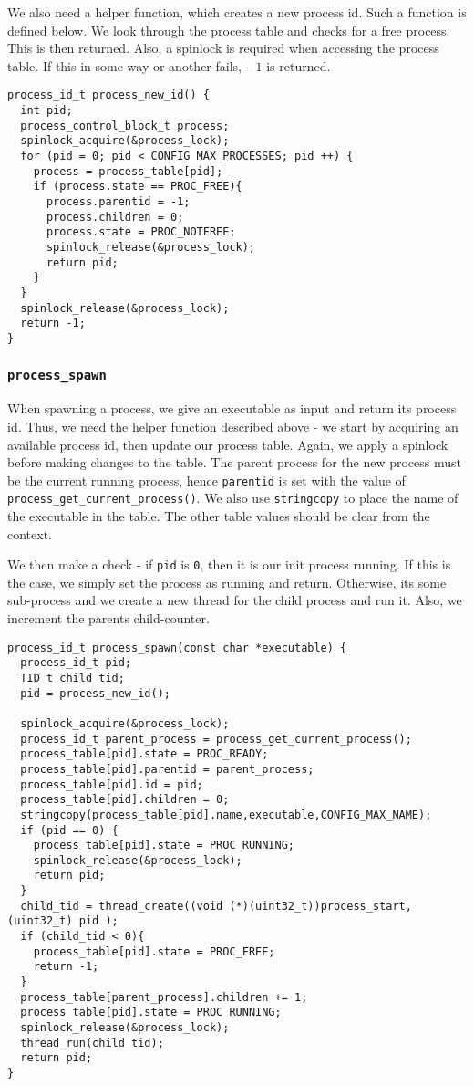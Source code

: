 \documentclass[a4paper,12pt]{article}
\begin{document}
We also need a helper function, which creates a new process id. Such a function is defined below. We look through the process table and checks for a free process. This is then returned. Also, a spinlock is required when accessing the process table. If this in some way or another fails, $-1$ is returned.
\begin{lstlisting}
process_id_t process_new_id() {
  int pid;
  process_control_block_t process;
  spinlock_acquire(&process_lock);
  for (pid = 0; pid < CONFIG_MAX_PROCESSES; pid ++) {
    process = process_table[pid];
    if (process.state == PROC_FREE){
      process.parentid = -1;
      process.children = 0;
      process.state = PROC_NOTFREE;
      spinlock_release(&process_lock);
      return pid;
    }
  }
  spinlock_release(&process_lock);
  return -1;
}
\end{lstlisting}

\subsubsection{\texttt{process\_spawn}}

When spawning a process, we give an executable as input and return its process id. Thus, we need the helper function described above - we start by acquiring an available process id, then update our process table. Again, we apply a spinlock before making changes to the table. The parent process for the new process must be the current running process, hence \texttt{parentid} is set with the value of \texttt{process\_get\_current\_process()}. We also use \texttt{stringcopy} to place the name of the executable in the table. The other table values should be clear from the context.

We then make a check - if \texttt{pid} is \texttt{0}, then it is our init process running. If this is the case, we simply set the process as running and return. Otherwise, its some sub-process and we create a new thread for the child process and run it. Also, we increment the parents child-counter.

\begin{lstlisting}
process_id_t process_spawn(const char *executable) {
  process_id_t pid;
  TID_t child_tid;
  pid = process_new_id();

  spinlock_acquire(&process_lock);
  process_id_t parent_process = process_get_current_process();
  process_table[pid].state = PROC_READY;
  process_table[pid].parentid = parent_process;
  process_table[pid].id = pid;
  process_table[pid].children = 0;
  stringcopy(process_table[pid].name,executable,CONFIG_MAX_NAME);
  if (pid == 0) {
    process_table[pid].state = PROC_RUNNING;
    spinlock_release(&process_lock);
    return pid;
  }
  child_tid = thread_create((void (*)(uint32_t))process_start,(uint32_t) pid );
  if (child_tid < 0){
    process_table[pid].state = PROC_FREE;
    return -1;
  }
  process_table[parent_process].children += 1;
  process_table[pid].state = PROC_RUNNING;
  spinlock_release(&process_lock);
  thread_run(child_tid);
  return pid;
}
\end{lstlisting}
\end{document}
